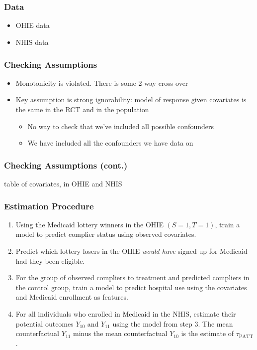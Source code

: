 \documentclass{beamer}
\begin{document}
\section[Data]{}

\begin{frame}
\frametitle{Data}
\begin{itemize}
\item OHIE data
\item NHIS data
\end{itemize}
\end{frame}


\begin{frame}
\frametitle{Checking Assumptions}
\begin{itemize}
\item Monotonicity is violated. There is some 2-way cross-over
\item Key assumption is strong ignorability: model of response given covariates is the same in the RCT and in the population
\begin{itemize}
\item No way to check that we've included all possible confounders
\item We have included all the confounders we have data on
\end{itemize}
\end{itemize}
\end{frame}

\begin{frame}
\frametitle{Checking Assumptions (cont.)}
table of covariates, in OHIE and NHIS
\end{frame}


\begin{frame} %
\frametitle{Estimation Procedure}
\begin{enumerate}
\item Using the Medicaid lottery winners in the OHIE $(S=1, T=1)$, train a model to predict complier status using observed covariates.
\item Predict which lottery losers in the OHIE \textit{would have} signed up for Medicaid had they been eligible.
\item For the group of observed compliers to treatment and predicted compliers in the control group, train a model to predict hospital use using the covariates and Medicaid enrollment as features. 
\item For all individuals who enrolled in Medicaid in the NHIS, estimate their potential outcomes $Y_{10}$ and $Y_{11}$ using the model from step 3.  The mean counterfactual $Y_{11}$ minus the mean counterfactual $Y_{10}$ is the estimate of $\tau_{\text{PATT}}$.
\end{enumerate}
\end{frame}
\end{document}
